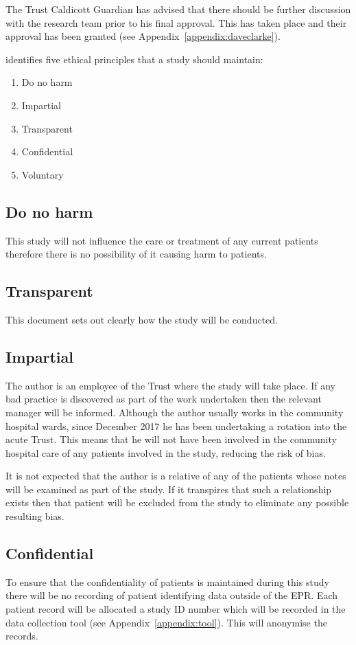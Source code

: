 \documentclass
[
	12pt,
	a4paper,
	oneside,
]{article}
\begin{document}
The Trust Caldicott Guardian has advised that there should be further discussion with 
the research team prior to his final approval. This has taken place and their 
approval has been granted (see Appendix~\ref{appendix:daveclarke}).

\textcite{biggam:15} identifies five ethical principles that a study should maintain:
\begin{enumerate}
\item Do no harm
\item Impartial
\item Transparent
\item Confidential
\item Voluntary
\end{enumerate}

\subsection{Do no harm}
This study will not influence the care or treatment of any current patients therefore
there is no possibility of it causing harm to patients.

\subsection{Transparent}
This document sets out clearly how the study will be conducted.

\subsection{Impartial}
The author is an employee of the Trust where the study will take place. If any bad
practice is discovered as part of the work undertaken then the relevant manager
will be informed. Although the author usually works in the community hospital wards,
since December 2017 he has been undertaking a rotation into the acute Trust. This 
means that he will not have been involved in the community hospital care of any
patients involved in the study, reducing the risk of bias.

It is not expected that the author is a relative of any of the patients
whose notes will be examined as part of the study. If it transpires that such a 
relationship exists then that patient will be excluded from the study to eliminate
any possible resulting bias.

\subsection{Confidential}
To ensure that the confidentiality of patients is maintained during this study there
will be no recording of patient identifying data outside of the EPR. Each patient
record will be allocated a study ID number which will be recorded in the data collection
tool (see Appendix~\ref{appendix:tool}). This will anonymise the records.
\end{document}
